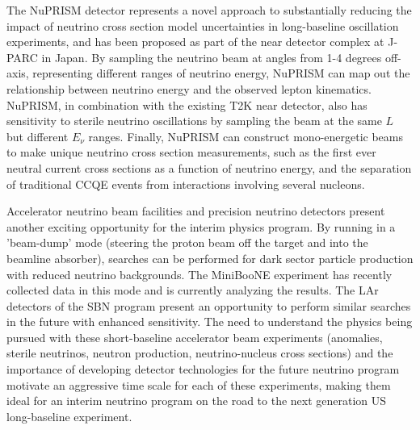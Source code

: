 The NuPRISM detector represents a novel approach to substantially reducing the impact of neutrino cross section model uncertainties in long-baseline oscillation experiments, and has been proposed as part of the near detector complex at J-PARC in Japan. By sampling the neutrino beam at angles from 1-4 degrees off-axis, representing different ranges of neutrino energy, NuPRISM can map out the relationship between neutrino energy and the observed lepton kinematics. NuPRISM, in combination with the existing T2K near detector, also has sensitivity to sterile neutrino oscillations by sampling the beam at the same $L$ but different $E_{\nu}$ ranges. Finally, NuPRISM can construct mono-energetic beams to make unique neutrino cross section measurements, such as the first ever neutral current cross sections as a function of neutrino energy, and the separation of traditional CCQE events from interactions involving several nucleons.

Accelerator neutrino beam facilities and precision neutrino detectors present another exciting opportunity for the interim physics program.  By running in a 'beam-dump' mode (steering the proton beam off the target and into the beamline absorber), searches can be performed for dark sector particle production with reduced neutrino backgrounds.  The MiniBooNE experiment has recently collected data in this mode and is currently analyzing the results.  The LAr detectors of the SBN program present an opportunity to perform similar searches in the future with enhanced sensitivity.       
The need to understand the physics being pursued with these short-baseline accelerator beam experiments (anomalies, sterile neutrinos, neutron production, neutrino-nucleus cross sections) and the importance of developing detector technologies for the future neutrino program motivate an aggressive time scale for each of these experiments, making them ideal for an interim neutrino program on the road to the next generation US long-baseline experiment.  
